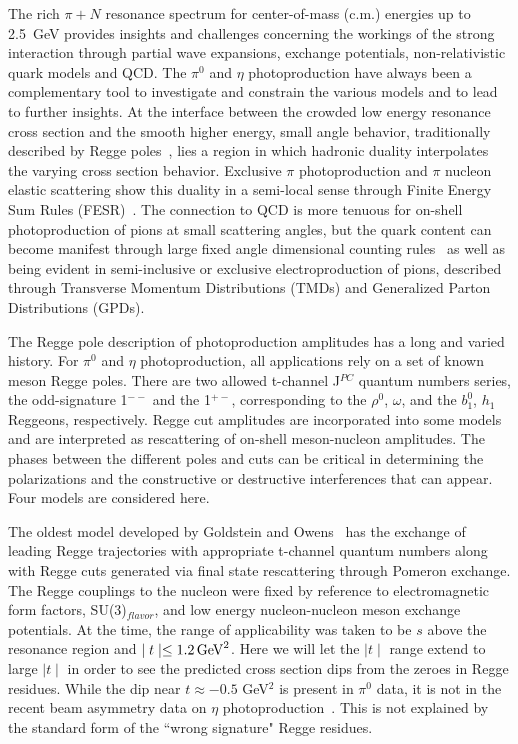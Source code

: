 \documentclass[aps,prc,twocolumn,floatfix,showpacs,preprintnumbers,amsmath,amssymb,superscriptaddress,linenumbers]{revtex4-1}
\begin{document}
The rich $\pi + N$ resonance spectrum for center-of-mass 
(c.m.) energies up to 2.5~GeV provides insights and challenges concerning 
the workings of the strong interaction through partial wave expansions, 
exchange potentials, non-relativistic quark models and QCD. The $\pi^0$ 
and $\eta$ photoproduction have always been a complementary tool to 
investigate and constrain the various models and to lead to further 
insights. At the interface between the crowded low energy resonance 
cross section and the smooth higher energy, small angle behavior, 
traditionally described by Regge poles~\cite{Ader:1967tqj}, lies a 
region in which hadronic duality interpolates the varying cross section 
behavior. Exclusive $\pi$ photoproduction and $\pi$ nucleon elastic 
scattering show this duality in a semi-local sense through Finite Energy 
Sum Rules (FESR)~\cite{Armenian:1974xd}. The connection to QCD is more 
tenuous for on-shell photoproduction of pions at small scattering angles, 
but the quark content can become manifest through large fixed angle 
dimensional counting rules~\cite{Brodsky:1973kr} as well as being evident 
in semi-inclusive or exclusive electroproduction of pions, described 
through Transverse Momentum Distributions (TMDs)  and Generalized Parton 
Distributions (GPDs).


The Regge pole description of photoproduction amplitudes 
has a long and varied history. For $\pi^0$ and $\eta$ photoproduction, 
all applications rely on a set of known meson Regge poles. There are 
two allowed t-channel J$^{PC}$ quantum numbers series, the odd-signature 
1$^{--}$ and the 1$^{+-}$, corresponding to the $\rho^0$, $\omega$, and 
the $b^0_1$, $h_1$ Reggeons, respectively. Regge cut amplitudes are 
incorporated into some models and are interpreted as rescattering of 
on-shell meson-nucleon amplitudes.  The phases between the different 
poles and cuts can be critical in determining the polarizations and the 
constructive or destructive interferences that can appear. Four models 
are considered here.

The oldest model developed by Goldstein and 
Owens~\cite{Goldstein:1973xn} has the exchange of leading Regge 
trajectories with appropriate t-channel quantum numbers along with 
Regge cuts generated via final state rescattering through Pomeron 
exchange. The Regge couplings to the nucleon were fixed by reference 
to electromagnetic form factors, SU(3)$_{flavor}$, and low energy 
nucleon-nucleon meson exchange potentials. At the time, the range of 
applicability was taken to be $s$ above the resonance region and $\mid 
t \mid \le 1.2 \, {\rm GeV}^2$. Here we will let the $\mid t \mid$ 
range extend to large $\mid t \mid$ in order to see the predicted cross 
section dips from the zeroes in Regge residues. While the dip near 
$t\approx -0.5$ GeV$^2$ is present in $\pi^0$ data, it is not in the 
recent beam asymmetry data on $\eta$ 
photoproduction~\cite{AlGhoul:2017nbp}. This is not explained by the 
standard form of the ``wrong signature" Regge residues. 
\end{document}
